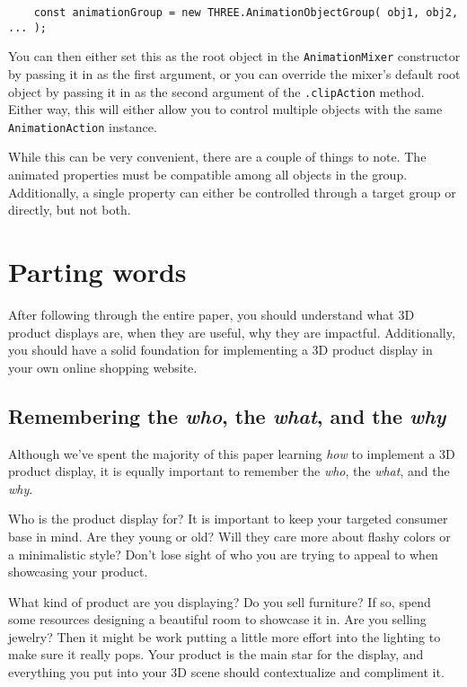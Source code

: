 \documentclass[10pt,final,journal,compsoc]{IEEEtran}
\begin{document}
    \begin{lstlisting}
    const animationGroup = new THREE.AnimationObjectGroup( obj1, obj2, ... );
    \end{lstlisting}
    
    You can then either set this as the root object in the \verb|AnimationMixer| constructor by passing it in as the first argument, or you can override the mixer's default root object by passing it in as the second argument of the \verb|.clipAction| method. Either way, this will either allow you to control multiple objects with the same \verb|AnimationAction| instance.
    
    While this can be very convenient, there are a couple of things to note. The animated properties must be compatible among all objects in the group. Additionally, a single property can either be controlled through a target group or directly, but not both.



\section{Parting words}
After following through the entire paper, you should understand what 3D product displays are, when they are useful, why they are impactful. Additionally, you should have a solid foundation for implementing a 3D product display in your own online shopping website.

    \subsection{Remembering the \textit{who}, the \textit{what}, and the \textit{why}}
    Although we've spent the majority of this paper learning \textit{how} to implement a 3D product display, it is equally important to remember the \textit{who}, the \textit{what}, and the \textit{why}.
    
    Who is the product display for? It is important to keep your targeted consumer base in mind. Are they young or old? Will they care more about flashy colors or a minimalistic style? Don't lose sight of who you are trying to appeal to when showcasing your product.
    
    What kind of product are you displaying? Do you sell furniture? If so, spend some resources designing a beautiful room to showcase it in. Are you selling jewelry? Then it might be work putting a little more effort into the lighting to make sure it really pops. Your product is the main star for the display, and everything you put into your 3D scene should contextualize and compliment it.
    
\end{document}
